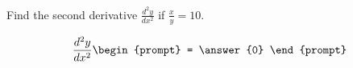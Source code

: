 \documentclass{ximera}
\author{Gregory Hartman \and Matthew Carr}
\begin{document}
\begin{exercise}





Find the second derivative $\frac{d^2y}{dx^2}$ if $\frac{x}{y}=10$.

\[
\frac{d^2y}{dx^2}
\begin{prompt}
= \answer{0}
\end{prompt}
\]

\end{exercise}
\end{document}
